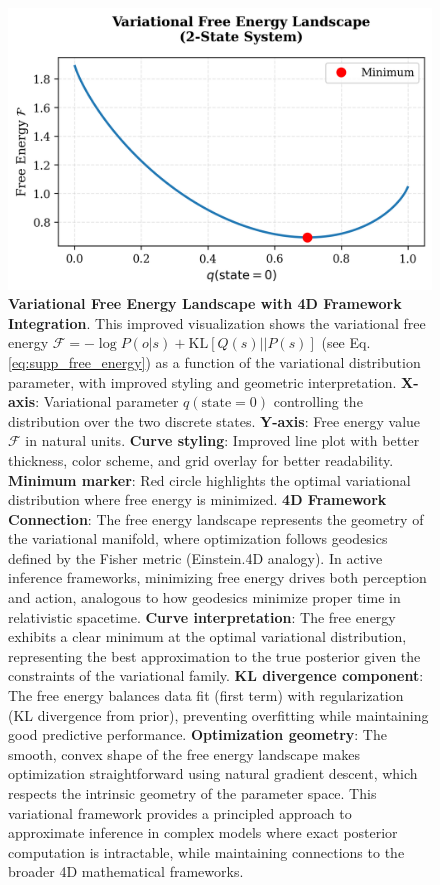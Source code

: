 \documentclass[
  10pt,
]{article}
\begin{document}
\begin{figure}
\centering
\includegraphics{../output/figures/free_energy_curve.png}
\caption{\textbf{Variational Free Energy Landscape with 4D Framework
Integration}. This improved visualization shows the variational free
energy \(\mathcal{F} = -\log P(o|s) + \text{KL}[Q(s)||P(s)]\) (see Eq.
\eqref{eq:supp_free_energy}) as a function of the variational
distribution parameter, with improved styling and geometric
interpretation. \textbf{X-axis}: Variational parameter
\(q(\text{state}=0)\) controlling the distribution over the two discrete
states. \textbf{Y-axis}: Free energy value \(\mathcal{F}\) in natural
units. \textbf{Curve styling}: Improved line plot with better thickness,
color scheme, and grid overlay for better readability. \textbf{Minimum
marker}: Red circle highlights the optimal variational distribution
where free energy is minimized. \textbf{4D Framework Connection}: The
free energy landscape represents the geometry of the variational
manifold, where optimization follows geodesics defined by the Fisher
metric (Einstein.4D analogy). In active inference frameworks, minimizing
free energy drives both perception and action, analogous to how
geodesics minimize proper time in relativistic spacetime. \textbf{Curve
interpretation}: The free energy exhibits a clear minimum at the optimal
variational distribution, representing the best approximation to the
true posterior given the constraints of the variational family.
\textbf{KL divergence component}: The free energy balances data fit
(first term) with regularization (KL divergence from prior), preventing
overfitting while maintaining good predictive performance.
\textbf{Optimization geometry}: The smooth, convex shape of the free
energy landscape makes optimization straightforward using natural
gradient descent, which respects the intrinsic geometry of the parameter
space. This variational framework provides a principled approach to
approximate inference in complex models where exact posterior
computation is intractable, while maintaining connections to the broader
4D mathematical frameworks.}
\end{figure}
\end{document}
